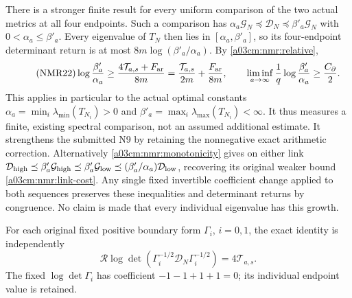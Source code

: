 There is a stronger finite result for every uniform comparison of the
two actual metrics at all four endpoints. Such a comparison has
$\alpha_a\mathcal G_N\preceq\mathcal D_N
\preceq\beta'_a\mathcal G_N$ with $0<\alpha_a\leq\beta'_a$.
Every eigenvalue of $T_N$ then lies in
$[\alpha_a,\beta'_a]$, so its four-endpoint determinant return is at
most $8m\log(\beta'_a/\alpha_a)$. By \eqref{a03cm:nmr:relative},
\begin{equation}\tag{NMR22}\label{a03cm:nmr:uniform-cost}
\log\frac{\beta'_a}{\alpha_a}
\geq\frac{4\mathcal T_{a,s}+F_{\rm ar}}{8m}
=\frac{\mathcal T_{a,s}}{2m}+\frac{F_{\rm ar}}{8m},\qquad
\liminf_{a\to\infty}\frac1q\log\frac{\beta'_a}{\alpha_a}
\geq\frac{C_\partial}{2}.
\end{equation}
This applies in particular to the actual optimal constants
$\alpha_a=\min_i\lambda_{\min}(T_{N_i})>0$ and
$\beta'_a=\max_i\lambda_{\max}(T_{N_i})<\infty$.
It thus measures a finite, existing spectral comparison, not an
assumed additional estimate. It strengthens the submitted N9 by
retaining the nonnegative exact arithmetic correction.
Alternatively \eqref{a03cm:nmr:monotonicity} gives on either link
$\mathcal D_{\rm high}\preceq\beta'_a\mathcal G_{\rm high}
\preceq\beta'_a\mathcal G_{\rm low}
\preceq(\beta'_a/\alpha_a)\mathcal D_{\rm low}$,
recovering its original weaker bound \eqref{a03cm:nmr:link-cost}.
Any single fixed invertible coefficient change applied to both
sequences preserves these inequalities and determinant returns by
congruence. No claim is made that every individual eigenvalue has
this growth.

For each original fixed positive boundary form $\Gamma_i$, $i=0,1$,
the exact identity is independently
\begin{equation}\tag{NMR23}\label{a03cm:nmr:fixed-boundary}
\mathcal R\log\det
  (\Gamma_i^{-1/2}\mathcal D_N\Gamma_i^{-1/2})
=4\mathcal T_{a,s}.
\end{equation}
The fixed $\log\det\Gamma_i$ has coefficient
$-1-1+1+1=0$; its individual endpoint value is retained.

